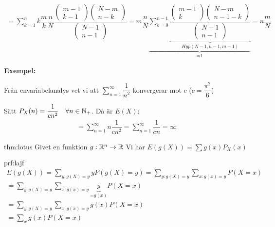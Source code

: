 \begin{equation*}
  \begin{gathered}
    = \sum_{k=1}^{n}k\dfrac{m}{k}\dfrac{n}{N}\dfrac{\begin{pmatrix}m-1\\k-1\end{pmatrix}\begin{pmatrix}N-m\\n-k\end{pmatrix}}{\begin{pmatrix}N-1\\n-1\end{pmatrix}} = m\dfrac{n}{N}\underbrace{\sum_{k=0}^{n-1}\underbrace{\dfrac{\begin{pmatrix}m-1\\k\end{pmatrix}\begin{pmatrix}N-m\\n-1-k\end{pmatrix}}{\begin{pmatrix}N-1\\n-1\end{pmatrix}}}_{\text{$Hyp(N-1,n-1,m-1)$}}
    }_{\text{=1}} = n\dfrac{m}{N}
  \end{gathered}
\end{equation*}
\par\bigskip
\noindent\textbf{Exempel:}\par
\noindent Från envariabelanalys vet vi att $\sum_{n=1}^{\infty}\dfrac{1}{n^2}$ konvergerar mot $c$ ($c = \dfrac{\pi^2}{6}$)\par
\noindent Sätt $P_X(n) = \dfrac{1}{cn^2}\quad \forall n\in\mathbb{N}_+$. Då är $E(X)$:
\begin{equation*}
  \begin{gathered}
    = \sum_{n=1}^{\infty}n\dfrac{1}{cn^2} = \sum_{n=1}^{\infty}\dfrac{1}{cn} = \infty
  \end{gathered}
\end{equation*}
\par\bigskip
\begin{theo}{thm:lotus}
  Givet en funktion $g:\mathbb{R}^n\to\mathbb{R}$ Vi har $E(g(X)) = \sum g(x)P_X(x)$
\end{theo}
\par\bigskip
\begin{prf}{prf:lajf}
  \begin{equation*}
    \begin{gathered}
      E(g(X)) = \sum_{y:g(X)=y} yP(g(X)=y) = \sum_{y:g(X)=y}\sum_{x:g(x)=y}P(X=x)\\
      =\sum_{y:g(X)=y}\sum_{x:g(x)=y}\underbrace{y}_{\text{=$g(x)$}}P(X=x)\\
      =\sum_{y:g(X)=y}\sum_{x:g(x)=y}g(x)P(X=x)\\
      = \sum_{x}g(x)P(X=x)
    \end{gathered}
  \end{equation*}
\end{prf}
